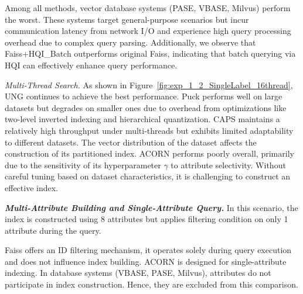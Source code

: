 \documentclass[sigconf, nonacm]{acmart}
\begin{document}
	Among all methods, vector database systems (PASE, VBASE, Milvus) perform the worst. These systems target general-purpose scenarios but incur communication latency from network I/O and experience high query processing overhead due to complex query parsing. Additionally, we observe that Faiss+HQI\_Batch outperforms original Faiss, indicating that batch querying via HQI can effectively enhance query performance.
	
	\textit{Multi-Thread Search.}
	As shown in Figure~\ref{fig:exp_1_2_SingleLabel_16thread}, UNG continues to achieve the best performance. 
	Puck performs well on large datasets but degrades on smaller ones due to overhead from optimizations like two-level inverted indexing and hierarchical quantization. CAPS maintains a relatively high throughput under multi-threads but exhibits limited adaptability to different datasets. The vector distribution of the dataset affects the construction of its partitioned index.
	 ACORN performs poorly overall, primarily due to the sensitivity of its hyperparameter $\gamma$ to attribute selectivity. Without careful tuning based on dataset characteristics, it is challenging to construct an effective index.
	
	\textit{\textbf{Multi-Attribute Building and Single-Attribute Query.}}
	In this scenario, the index is constructed using 8 attributes but applies filtering condition on only 1 attribute during the query.
	
	Faiss offers an ID filtering mechanism, it operates solely during query execution and does not influence index building. ACORN is   designed for single-attribute indexing. In database systems (VBASE, PASE, Milvus), 
	attributes do not participate in index construction.
	Hence, they are excluded from this comparison.
	
\end{document}
